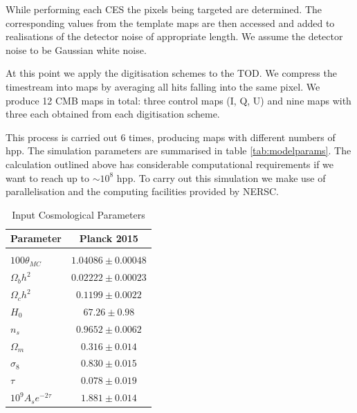 \documentclass[apj]{emulateapj}
\begin{document}
While performing each CES the pixels being targeted are determined. The corresponding values from the template maps are then accessed and added to realisations of the detector noise of appropriate length. We assume the detector noise to be Gaussian white noise.

At this point we apply the digitisation schemes to the TOD. We compress the timestream into maps by averaging all hits falling into the same pixel. We produce 12 CMB maps in total: three control maps (I, Q, U) and nine maps with three each obtained from each digitisation scheme.

This process is carried out 6 times, producing maps with different numbers of hpp. The simulation parameters are summarised in table \ref{tab:modelparams}. The calculation outlined above has considerable computational requirements if we want to reach up to $\sim 10^8$ hpp. To carry out this simulation we make use of parallelisation and the computing facilities provided by NERSC.

\begin{table}[tbh]
\begin{center}
\caption{\label{tab:inputcosparams} Input Cosmological Parameters}
\small
\begin{tabular}{l | c}
Parameter & Planck 2015\\
\hline\\[-1.5ex]
$100\theta_{MC}$ & $ 1.04086 \pm 0.00048$\\
$\Omega_b h^2$ & $  0.02222 \pm 0.00023$\\
$\Omega_c h^2$ & $ 0.1199 \pm 0.0022$\\
$H_0$ & $67.26 \pm 0.98$\\
$n_s$ & $0.9652 \pm 0.0062$\\
$\Omega_m$ & $0.316 \pm 0.014$\\
$\sigma_8$ & $0.830 \pm 0.015 $\\
$\tau$ & $0.078 \pm 0.019$\\
$10^9 A_s e^{-2\tau}$ & $1.881 \pm 0.014 $\\
\end{tabular}
 \normalsize
\end{center}
\end{table}
\end{document}
